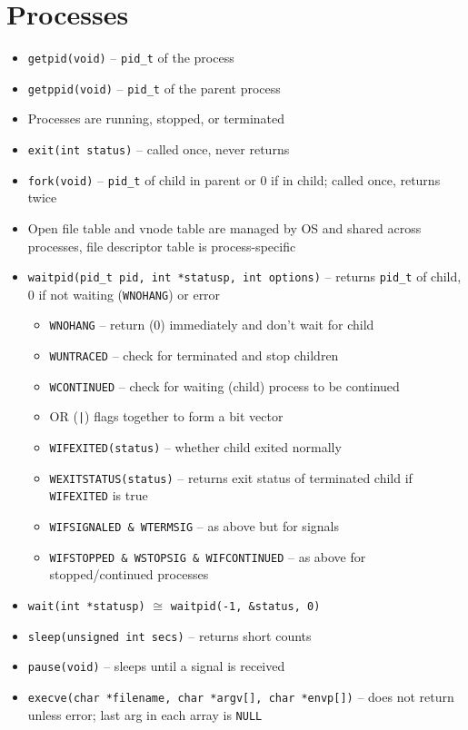 \documentclass[twocolumn]{article}
\renewcommand{\tt}[1]{\texttt{#1}}
\begin{document}
\section{Processes}
\begin{itemize}[noitemsep]
    \item \tt{getpid(void)} -- \tt{pid\_t} of the process
    \item \tt{getppid(void)} -- \tt{pid\_t} of the parent process
    \item Processes are running, stopped, or terminated
    \item \tt{exit(int status)} -- called once, never returns
    \item \tt{fork(void)} -- \tt{pid\_t} of child in parent or 0 if in child; called once, returns twice
    \item Open file table and vnode table are managed by OS and shared across processes, file descriptor table is process-specific
    \item \tt{waitpid(pid\_t pid, int *statusp, int options)} -- returns \tt{pid\_t} of child, 0 if not waiting (\tt{WNOHANG}) or error
    \begin{itemize}[noitemsep]
        \item \tt{WNOHANG} -- return (0) immediately and don't wait for child
        \item \tt{WUNTRACED} -- check for terminated and stop children
        \item \tt{WCONTINUED} -- check for waiting (child) process to be continued
        \item OR (\tt{|}) flags together to form a bit vector
        \item \tt{WIFEXITED(status)} -- whether child exited normally
        \item \tt{WEXITSTATUS(status)} -- returns exit status of terminated child if \tt{WIFEXITED} is true
        \item \tt{WIFSIGNALED \& WTERMSIG} -- as above but for signals
        \item \tt{WIFSTOPPED \& WSTOPSIG \& WIFCONTINUED} -- as above for stopped/continued processes
    \end{itemize}
    \item \tt{wait(int *statusp)} $\cong$ \tt{waitpid(-1, \&status, 0)}
    \item \tt{sleep(unsigned int secs)} -- returns short counts
    \item \tt{pause(void)} -- sleeps until a signal is received
    \item \tt{execve(char *filename, char *argv[], char *envp[])} -- does not return unless error; last arg in each array is \tt{NULL}
\end{itemize}
\end{document}
